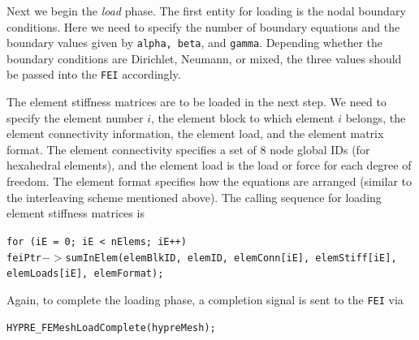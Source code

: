 Next we begin the {\it load} phase. The first entity for loading is the
nodal boundary conditions. Here we need to specify the number of boundary
equations and the boundary values given by {\tt alpha, beta}, and {\tt gamma}.  Depending whether the boundary conditions are Dirichlet, Neumann, or mixed,
the three values should be passed into the {\tt FEI} accordingly. 

The element stiffness matrices are to be loaded in the next step. We need
to specify the element number $i$, the element block to which element $i$
belongs, the element connectivity information, the element load, and the
element matrix format. The element connectivity specifies a set of $8$ node
global IDs (for hexahedral elements), and the element load is the load or
force for each degree of freedom.  The element format specifies how the
equations are arranged (similar to the interleaving scheme mentioned above).
The calling sequence for loading element stiffness matrices is
\begin{tabbing}
\hspace{0.5in} \= {\tt for (iE = 0; iE < nElems; iE++)} \\
 \> \hspace{0.5in} {\tt feiPtr$->$sumInElem(elemBlkID, elemID, elemConn[iE], elemStiff[iE],} \\
 \> \hspace{1.5in} {\tt elemLoads[iE], elemFormat);}
\end{tabbing}
Again, to complete the loading phase, a completion signal is sent to 
the {\tt FEI} via
\begin{tabbing}
\hspace{0.5in} \= {\tt HYPRE\_FEMeshLoadComplete(hypreMesh);}
\end{tabbing}
 
